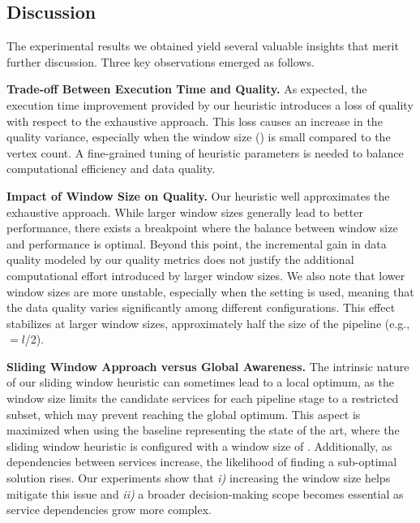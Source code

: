   {\color{OurColor}
    \subsection{Discussion}
    The experimental results we obtained yield several valuable insights that merit further discussion. Three key observations emerged as follows.

    \vspace{0.5em}

    \noindent\textbf{Trade-off Between Execution Time and Quality.} As expected, the execution time improvement provided by our heuristic introduces a loss of quality with respect to the exhaustive approach. This loss causes an increase in the quality variance, especially when the window size (\windowsize) is small compared to the vertex count. A fine-grained tuning of heuristic parameters is needed to balance computational efficiency and data quality.

    \vspace{0.5em}

    \noindent\textbf{Impact of Window Size on Quality.} Our heuristic well approximates the exhaustive approach. While larger window sizes generally lead to better performance, there exists a breakpoint where the balance between window size and performance is optimal. Beyond this point, the incremental gain in data quality modeled by our quality metrics does not justify the additional computational effort introduced by larger window sizes. We also note that lower window sizes are more unstable, especially when the  \wide setting is used, meaning that the data quality varies significantly among different configurations. This effect stabilizes at larger window sizes, approximately half the size of the pipeline (e.g., \windowsize$=$$l$/2).

    \vspace{0.5em}

    \noindent\textbf{Sliding Window Approach versus Global Awareness.} The intrinsic nature of our sliding window heuristic can sometimes lead to a local optimum, as the window size limits the candidate services for each pipeline stage to a restricted subset, which may prevent reaching the global optimum. This aspect is maximized when using the baseline representing the state of the art, where the sliding window heuristic is configured with a window size of . Additionally, as dependencies between services increase, the likelihood of finding a sub-optimal solution rises. Our experiments show that \emph{i)} increasing the window size helps mitigate this issue and \emph{ii)} a broader decision-making scope becomes essential as service dependencies grow more complex.
  }

